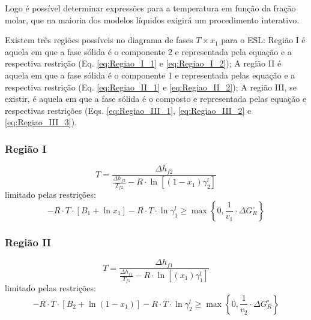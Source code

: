 Logo é possível determinar expressões para a temperatura em função da fração molar, que na maioria dos modelos líquidos exigirá um procedimento interativo.

Existem três regiões possíveis no diagrama de fases $T\times x_{1}$ para o ESL:  Região I é aquela em que a fase sólida é o componente 2 e representada pela equação e a respectiva restrição (Eq. \ref{eq:Regiao_I_1} e \ref{eq:Regiao_I_2}); A região II é aquela em que a fase sólida é o componente 1 e representada pelas equação e a respectiva restrição (Eq. \ref{eq:Regiao_II_1} e \ref{eq:Regiao_II_2}); A região III, se existir, é aquela em que a fase sólida é o composto  e representada pelas equação e respectivas restrições (Eqs. \ref{eq:Regiao_III_1}, \ref{eq:Regiao_III_2} e \ref{eq:Regiao_III_3}).

\subsubsection{Região I}
\begin{equation}\label{eq:Regiao_I_1}
T=\frac{\Delta h_{f2}}{\frac{\Delta h_{f2}}{T_{f2}}-R\cdot\ln[(1-x_{1})\gamma_{2}^{l}]}
\end{equation}
limitado pelas restrições:
\begin{equation}\label{eq:Regiao_I_2}
-R\cdot T\cdot[B_{1}+\ln x_{1}]-R\cdot T\cdot\ln\gamma_{1}^{l}\geq\max\left\{0,\frac{1}{v_1}\cdot\Delta G_{R}^{\circ} \right\}
\end{equation}

\subsubsection{Região II}
\begin{equation}\label{eq:Regiao_II_1}
T=\frac{\Delta h_{f1}}{\frac{\Delta h_{f1}}{T_{f1}}-R\cdot\ln[(x_{1})\gamma_{1}^{l}]}
\end{equation}
limitado pelas restrições:
\begin{equation}\label{eq:Regiao_II_2}
-R\cdot T\cdot[B_{2}+\ln(1- x_{1})]-R\cdot T\cdot\ln\gamma_{2}^{l}\geq\max\left\{0,\frac{1}{v_2}\cdot\Delta G_{R}^{\circ} \right\}
\end{equation}


